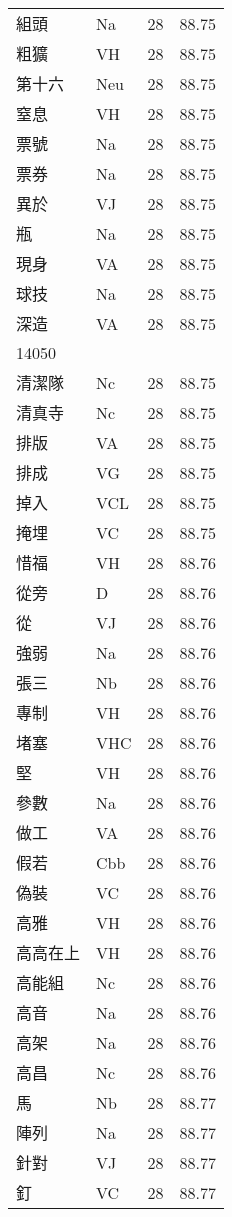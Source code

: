 \documentclass[twocolumn]{book}
\begin{document}
\begin{supertabular}{llrr}
組頭 & Na & 28 &  88.75\\
粗獷 & VH & 28 &  88.75\\
第十六 & Neu & 28 &  88.75\\
窒息 & VH & 28 &  88.75\\
票號 & Na & 28 &  88.75\\
票券 & Na & 28 &  88.75\\
異於 & VJ & 28 &  88.75\\
瓶 & Na & 28 &  88.75\\
現身 & VA & 28 &  88.75\\
球技 & Na & 28 &  88.75\\
深造 & VA & 28 &  88.75\\
14050\\
清潔隊 & Nc & 28 &  88.75\\
清真寺 & Nc & 28 &  88.75\\
排版 & VA & 28 &  88.75\\
排成 & VG & 28 &  88.75\\
掉入 & VCL & 28 &  88.75\\
掩埋 & VC & 28 &  88.75\\
惜福 & VH & 28 &  88.76\\
從旁 & D & 28 &  88.76\\
從 & VJ & 28 &  88.76\\
強弱 & Na & 28 &  88.76\\
張三 & Nb & 28 &  88.76\\
專制 & VH & 28 &  88.76\\
堵塞 & VHC & 28 &  88.76\\
堅 & VH & 28 &  88.76\\
參數 & Na & 28 &  88.76\\
做工 & VA & 28 &  88.76\\
假若 & Cbb & 28 &  88.76\\
偽裝 & VC & 28 &  88.76\\
高雅 & VH & 28 &  88.76\\
高高在上 & VH & 28 &  88.76\\
高能組 & Nc & 28 &  88.76\\
高音 & Na & 28 &  88.76\\
高架 & Na & 28 &  88.76\\
高昌 & Nc & 28 &  88.76\\
馬 & Nb & 28 &  88.77\\
陣列 & Na & 28 &  88.77\\
針對 & VJ & 28 &  88.77\\
釘 & VC & 28 &  88.77\\

\end{supertabular}
\end{document}
